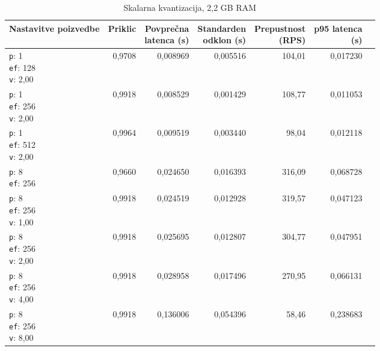 \begin{table}[htbp]
  \centering
\small
  \caption{Skalarna kvantizacija, 2,2 GB RAM}
  \label{tab:single-2cpu-2.2ram:sq:qdrant-dipl-baseline-tenant-subgraph-sq-ext-m16-ef-128-random-768-100-tenants-extended-upload-2026-08-18-11-38-36.json}
  \begin{tabularx}{\textwidth}{Xrrrrrr}
    \toprule
    Nastavitve poizvedbe & Priklic & \makecell{Povprečna\\latenca (s)} & \makecell{Standarden\\odklon (s)} & \makecell{Prepustnost\\(RPS)} & \makecell{p95 latenca\\(s)}  \\
    \midrule
    \makecell{\texttt{p}: 1\\\texttt{ef}: 128\\\texttt{v}: 2,00} & 0,9708 & 0,008969 & 0,005516 & 104,01 & 0,017230 \\
    \makecell{\texttt{p}: 1\\\texttt{ef}: 256\\\texttt{v}: 2,00} & 0,9918 & 0,008529 & 0,001429 & 108,77 & 0,011053 \\
    \makecell{\texttt{p}: 1\\\texttt{ef}: 512\\\texttt{v}: 2,00} & 0,9964 & 0,009519 & 0,003440 & 98,04 & 0,012118 \\
    \makecell{\texttt{p}: 8\\\texttt{ef}: 256} & 0,9660 & 0,024650 & 0,016393 & 316,09 & 0,068728 \\
    \makecell{\texttt{p}: 8\\\texttt{ef}: 256\\\texttt{v}: 1,00} & 0,9918 & 0,024519 & 0,012928 & 319,57 & 0,047123 \\
    \makecell{\texttt{p}: 8\\\texttt{ef}: 256\\\texttt{v}: 2,00} & 0,9918 & 0,025695 & 0,012807 & 304,77 & 0,047951 \\
    \makecell{\texttt{p}: 8\\\texttt{ef}: 256\\\texttt{v}: 4,00} & 0,9918 & 0,028958 & 0,017496 & 270,95 & 0,066131 \\
    \makecell{\texttt{p}: 8\\\texttt{ef}: 256\\\texttt{v}: 8,00} & 0,9918 & 0,136006 & 0,054396 & 58,46 & 0,238683 \\

\end{tabularx}
\end{table}
